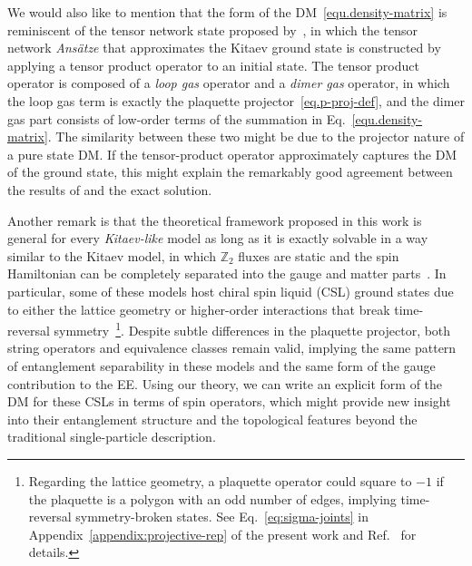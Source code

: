 We would also like to mention that the form of the DM~\eqref{equ.density-matrix} is reminiscent of the tensor network state proposed by~\cite{Lee-Kaneko-Okubo-Kawashima_2019}, in which the tensor network \textit{Ans\"atze} that approximates the Kitaev ground state is constructed by applying a tensor product operator to an initial state. The tensor product operator is composed of a \textit{loop gas} operator and a \textit{dimer gas} operator, in which the loop gas term is exactly the plaquette projector~\eqref{eq.p-proj-def}, and the dimer gas part consists of low-order terms of the summation in Eq.~\eqref{equ.density-matrix}. The similarity between these two might be due to the projector nature of a pure state DM. If the tensor-product operator approximately captures the DM of the ground state, this might explain the remarkably good agreement between the results of \cite{Lee-Kaneko-Okubo-Kawashima_2019} and the exact solution.

{
Another remark is that the theoretical framework proposed in this work is general for every \textit{Kitaev-like} model as long as it is exactly solvable in a way similar to the Kitaev model, in which $\mathbb{Z}_2$ fluxes are static and the spin Hamiltonian can be completely separated into the gauge and matter parts~\cite{Lee-Zhang-Xiang_2007, yao-kivelson, Peri-Ok-Tsirkin-Neupert-Baskaran-Greiter-Moessner-Thomale_2020, Fu_2019}. 
%
In particular, some of these models host chiral spin liquid (CSL) ground states due to either the lattice geometry or higher-order interactions that break time-reversal symmetry~\footnote{
%
Regarding the lattice geometry, a plaquette operator could square to $-1$ if the plaquette is a polygon with an odd number of edges, implying time-reversal symmetry-broken states. See Eq.~\eqref{eq:sigma-joints} in Appendix~\ref{appendix:projective-rep} of the present work and Ref.~\cite{Peri-Ok-Tsirkin-Neupert-Baskaran-Greiter-Moessner-Thomale_2020} for details.}. Despite subtle differences in the plaquette projector, both string operators and equivalence classes remain valid, implying the same pattern of entanglement separability in these models and the same form of the gauge contribution to the EE.
}
Using our theory, we can write an explicit form of the DM for these CSLs in terms of spin operators, which might provide new insight into their entanglement structure and {the topological features beyond the traditional single-particle description}.

